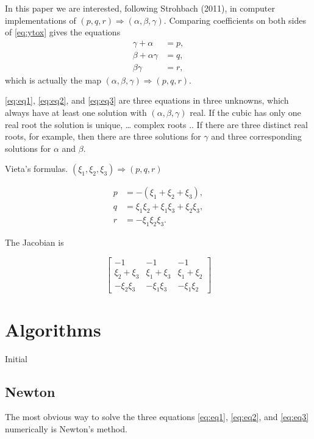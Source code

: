 \documentclass[
  12pt,
]{article}
\begin{document}
In this paper we are interested, following Strohbach (2011), in computer implementations of
\((p,q,r)\Rightarrow(\alpha,\beta,\gamma)\).
Comparing coefficients on both sides of \eqref{eq:ytox} gives the equations
\begin{align}
\gamma+\alpha&=p,\label{eq:eq1}\\
\beta+\alpha\gamma&=q,\label{eq:eq2}\\
\beta\gamma&=r,\label{eq:eq3}
\end{align}
which is actually the map \((\alpha,\beta,\gamma)\Rightarrow(p,q,r)\).

\eqref{eq:eq1}, \eqref{eq:eq2}, and \eqref{eq:eq3} are three equations in three unknowns, which always have at least one solution with \((\alpha,\beta,\gamma)\) real. If the cubic has only
one real root the solution is unique, \ldots{} complex roots .. If there are three distinct real roots,
for example, then there are three solutions for \(\gamma\) and three corresponding solutions
for \(\alpha\) and \(\beta\).

Vieta's formulas. \((\xi_1,\xi_2,\xi_3)\Rightarrow(p,q,r)\)

\begin{align}
p&=-(\xi_1+\xi_2+\xi_3),\\
q&=\xi_1\xi_2+\xi_1\xi_3+\xi_2\xi_3,\\
r&=-\xi_1\xi_2\xi_3.
\end{align}

The Jacobian is

\[
\begin{bmatrix}
-1&-1&-1\\
\xi_2+\xi_3&\xi_1+\xi_3&\xi_1+\xi_2\\
-\xi_2\xi_3&-\xi_1\xi_3&-\xi_1\xi_2
\end{bmatrix}
\]

\section{Algorithms}\label{algorithms}

Initial

\subsection{Newton}\label{newton}

The most obvious way to solve the three equations \eqref{eq:eq1}, \eqref{eq:eq2}, and \eqref{eq:eq3} numerically is Newton's method.
\end{document}
